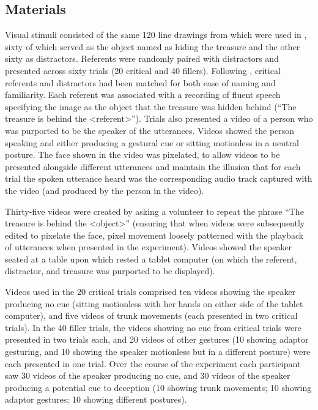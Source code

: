 \documentclass[a4paper,man,natbib]{apa6}
\newcommand*{\spex}[1]{``{#1}''} %
\let\oldtodo\todo
\renewcommand*{\todo}[1]{\oldtodo[fancyline]{#1}}
\begin{document}
\subsection{Materials}
Visual stimuli consisted of the same 120 line drawings from \citet{Snodgrass1980} which were used in \citet{Loy2017}, sixty of which served as the object named as hiding the treasure and the other sixty as distractors.
Referents were randomly paired with distractors and presented across sixty trials (20 critical and 40 fillers). 
Following \citet{Loy2017}, critical referents and distractors had been matched for both ease of naming and familiarity.
Each referent was associated with a recording of fluent speech specifying the image as the object that the treasure was hidden behind (``The treasure is behind the <referent>'').
Trials also presented a video of a person who was purported to be the speaker of the utterances. 
Videos showed the person speaking and either producing a gestural cue or sitting motionless in a neutral posture.
The face shown in the video was pixelated, to allow videos to be presented alongside different utterances and maintain the illusion that for each trial the spoken utterance heard was the corresponding audio track captured with the video (and produced by the person in the video).

Thirty-five videos were created by asking a volunteer to repeat the phrase \spex{The treasure is behind the <object>} (ensuring that when videos were subsequently edited to pixelate the face, pixel movement loosely patterned with the playback of utterances when presented in the experiment). \todo{JK: maybe instead just: Thirty-five videos were created.}
Videos showed the speaker seated at a table upon which rested a tablet computer (on which the referent, distractor, and treasure was purported to be displayed).

Videos used in the 20 critical trials comprised ten videos showing the speaker producing no cue (sitting motionless with her hands on either side of the tablet computer), and five videos of trunk movements (each presented in two critical trials).
In the 40 filler trials, the videos showing no cue from critical trials were presented in two trials each, and 20 videos of other gestures (10 showing adaptor gesturing, and 10 showing the speaker motionless but in a different posture) were each presented in one trial.
Over the course of the experiment each participant saw 30 videos of the speaker producing no cue, and 30 videos of the speaker producing a potential cue to deception (10 showing trunk movements; 10 showing adaptor gestures; 10 showing different postures).
\end{document}
